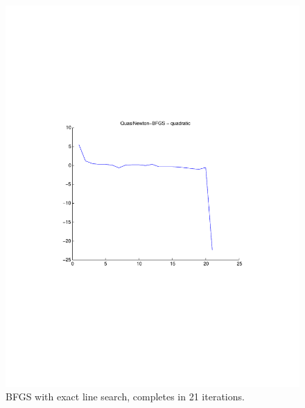 \documentclass[12pt]{amsart}
\begin{document}
\begin{figure}[thpb]
\centering
\includegraphics[scale=0.80,clip=true,viewport=1in 3in 8in 8in]{images/quad-exact/BFGS.pdf}
\caption{BFGS with exact line search, completes in 21 iterations.}
\label{fig:BFGS-exact}
\end{figure}
\end{document}
